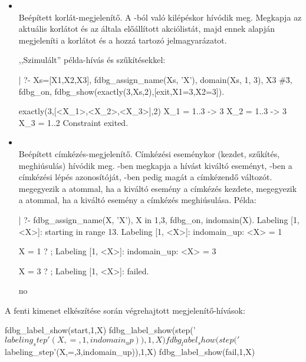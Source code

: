 \begin{itemize}
\item {} \\
Beépített korlát-megjelenítő. A -ból való kilépéskor hívódik
meg. Megkapja az aktuális korlátot és az általa előállított akciólistát, majd
ennek alapján megjeleníti a korlátot és a hozzá tartozó jelmagyarázatot. 

,,Szimulált'' példa-hívás  és  szűkítésekkel:

\begin{prologcode}
| ?- Xs=[X1,X2,X3], fdbg_assign_name(Xs, 'X'), 
     domain(Xs, 1, 3), X3 #\= 3, fdbg_on, 
     fdbg_show(exactly(3,Xs,2),[exit,X1=3,X2=3]).

exactly(3,[<X_1>,<X_2>,<X_3>],2)
    X_1 = 1..3 -> {3}
    X_2 = 1..3 -> {3}
    X_3 = 1..2
    Constraint exited.
\end{prologcode}

\item {}\\
Beépített címkézés-megjelenítő. Címkézési eseménykor (kezdet, szűkítés,
meghiúsulás) hívódik meg. -ben megkapja a hívást kiváltó
eseményt, -ben a címkézési lépés azonosítóját, -ben
pedig magát a címkézendő változót.  megegyezik a
 atommal, ha a kiváltó esemény a címkézés kezdete, megegyezik a 
atommal, ha a kiváltó esemény a címkézés meghiúsulása. Példa:

\begin{prologcode}
| ?- fdbg_assign_name(X, 'X'), X in {1,3}, fdbg_on,
     indomain(X).
Labeling [1, <X>]: starting in range {1}\/{3}.
Labeling [1, <X>]: indomain_up: <X> = 1

X = 1 ? ;
Labeling [1, <X>]: indomain_up: <X> = 3

X = 3 ? ;
Labeling [1, <X>]: failed.

no
\end{prologcode}

\end{itemize}

A fenti kimenet elkészítése során végrehajtott megjelenítő-hívások:

\begin{prologcode}
fdbg_label_show(start,1,X)
fdbg_label_show(step('$labeling_step'(X,=,1,indomain_up)),1,X)
fdbg_label_show(step('$labeling_step'(X,=,3,indomain_up)),1,X)
fdbg_label_show(fail,1,X)
\end{prologcode}

